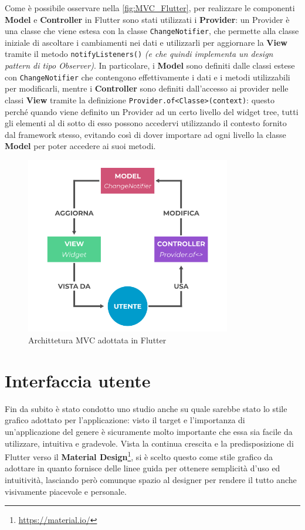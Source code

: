 Come è possibile osservare nella \autoref{fig:MVC_Flutter}, per realizzare le componenti \textbf{Model} e \textbf{Controller} in Flutter sono stati utilizzati i \textbf{Provider}: un Provider è una classe che viene estesa con la classe \texttt{ChangeNotifier}, che permette alla classe iniziale di ascoltare i cambiamenti nei dati e utilizzarli per aggiornare la \textbf{View} tramite il metodo \texttt{notifyListeners()} \textit{(e che quindi implementa un design pattern di tipo Observer)}. In particolare, i \textbf{Model} sono definiti dalle classi estese con \texttt{ChangeNotifier} che contengono effettivamente i dati e i metodi utilizzabili per modificarli, mentre i \textbf{Controller} sono definiti dall'accesso ai provider nelle classi \textbf{View} tramite la definizione \texttt{Provider.of<Classe>(context)}: questo perché quando viene definito un Provider ad un certo livello del widget tree, tutti gli elementi al di sotto di esso possono accedervi utilizzando il contesto fornito dal framework stesso, evitando così di dover importare ad ogni livello la classe \textbf{Model} per poter accedere ai suoi metodi.

\begin{figure}[h]
\centering
\includegraphics[width=0.8\textwidth]{img/MVC_Flutter}
\caption{Archittetura MVC adottata in Flutter}
\label{fig:MVC_Flutter}
\end{figure}

\section{Interfaccia utente}
Fin da subito è stato condotto uno studio anche su quale sarebbe stato lo stile grafico adottato per l'applicazione: visto il target e l'importanza di un'applicazione del genere è sicuramente molto importante che essa sia facile da utilizzare, intuitiva e gradevole.
Vista la continua crescita e la predisposizione di Flutter verso il \textbf{Material Design}\footnote{\url{https://material.io/}}, si è scelto questo come stile grafico da adottare in quanto fornisce delle linee guida per ottenere semplicità d'uso ed intuitività, lasciando però comunque spazio al designer per rendere il tutto anche visivamente piacevole e personale.

